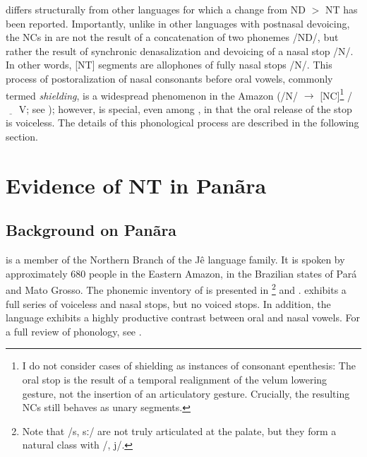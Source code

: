 \documentclass[output=paper,hidelinks]{langscibook}
\begin{document}
 differs structurally from other languages for which a change from ND $>$ NT has been reported. Importantly, unlike in other languages with postnasal devoicing, the NCs in  are not the result of a concatenation of two phonemes /ND/, but rather the result of synchronic denasalization and devoicing of a nasal stop /N/. In other words, [NT] segments are allophones of fully nasal stops /N/. This process of postoralization of nasal consonants before oral vowels, commonly termed \textit{shielding}, is a widespread phenomenon in the Amazon (/N/ $\rightarrow$ [NC]\footnote{I do not consider cases of shielding as instances of consonant epenthesis: The oral stop is the result of a temporal realignment of the velum lowering gesture, not the insertion of an articulatory gesture. Crucially, the resulting NCs still behaves as unary segments.} / $\underline{\hspace{1em}}$ V; see \citealt{stanton2017}); however,  is special, even among , in that the oral release of the stop is voiceless. The details of this phonological process are described in the following section.

\section{Evidence of NT in Panãra}\largerpage[-1]
\subsection{Background on Panãra}

 is a member of the Northern Branch of the Jê language family. It is spoken by approximately 680 people in the Eastern Amazon, in the Brazilian states of Par\'a and Mato Grosso. The phonemic inventory of  is presented in \footnote{Note that /s, sː/ are not truly articulated at the palate, but they form a natural class with /\textltailn, j/.} and .  exhibits a full series of voiceless and nasal stops, but no voiced stops. In addition, the language exhibits a highly productive contrast between oral and nasal vowels. For a full review of  phonology, see \citet{Lapierre2019}.
\end{document}
